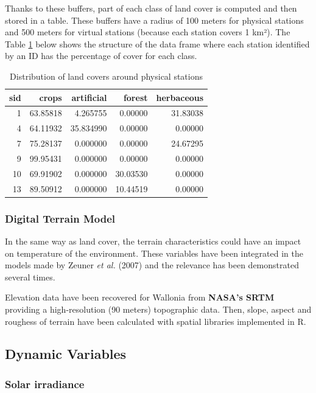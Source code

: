 \documentclass[12pt,twoside]{reedthesis}
\theoremstyle{definition}
\theoremstyle{definition}
\theoremstyle{definition}
\theoremstyle{remark}
\begin{document}
Thanks to these buffers, part of each class of land cover is computed
and then stored in a table. These buffers have a radius of 100 meters
for physical stations and 500 meters for virtual stations (because each
station covers 1 km²). The Table \ref{tab:clcperc} below shows the
structure of the data frame where each station identified by an ID has
the percentage of cover for each class.
\begin{table}

\caption{\label{tab:clcperc}Distribution of land covers around physical stations}
\centering
\begin{tabular}[t]{rrrrr}
\toprule
\textbf{sid} & \textbf{crops} & \textbf{artificial} & \textbf{forest} & \textbf{herbaceous}\\
\midrule
1 & 63.85818 & 4.265755 & 0.00000 & 31.83038\\
4 & 64.11932 & 35.834990 & 0.00000 & 0.00000\\
7 & 75.28137 & 0.000000 & 0.00000 & 24.67295\\
9 & 99.95431 & 0.000000 & 0.00000 & 0.00000\\
10 & 69.91902 & 0.000000 & 30.03530 & 0.00000\\
13 & 89.50912 & 0.000000 & 10.44519 & 0.00000\\
\bottomrule
\end{tabular}
\end{table}
\subsubsection{Digital Terrain Model}\label{digital-terrain-model}

In the same way as land cover, the terrain characteristics could have an
impact on temperature of the environment. These variables have been
integrated in the models made by Zeuner \emph{et al.} (2007) and the
relevance has been demonstrated several times.

Elevation data have been recovered for Wallonia from \textbf{NASA's
SRTM} providing a high-resolution (90 meters) topographic data. Then,
slope, aspect and roughess of terrain have been calculated with spatial
libraries implemented in R.

\subsection{Dynamic Variables}\label{dynamic-variables}

\subsubsection{Solar irradiance}\label{solar-irradiance}
\end{document}
